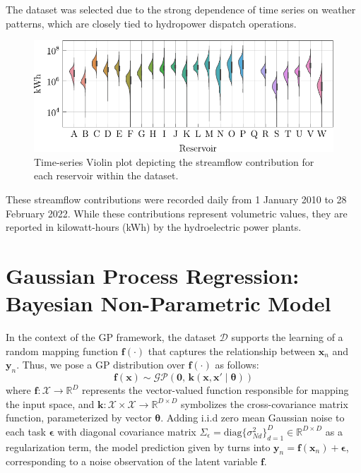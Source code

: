 \documentclass[10pt, xcolor=table]{beamer}
\begin{document}
\begin{frame}
	The dataset was selected due to the strong dependence of time series on weather patterns, which are closely tied to hydropower dispatch operations.
	
	\begin{figure}[htbp]
		\centering
		\includegraphics[height=0.25\textwidth]{images/ct_violinplot.pdf}
		\caption{Time-series Violin plot depicting the streamflow contribution for each reservoir within the dataset.}
	\end{figure}	
	
	These streamflow contributions were recorded daily from 1 January 2010 to 28 February 2022. While these contributions represent volumetric values, they are reported in kilowatt-hours (kWh) by the hydroelectric power plants.
\end{frame}



\section[Gaussian Process Regression]{Gaussian Process Regression: Bayesian Non-Parametric Model}
\begin{frame}
	In the context of the GP framework, the dataset $\mathcal{D}$ supports the learning of a random mapping function $\bm{f}(\cdot)$ that captures the relationship between $\bm{x}_n$ and $\bm{y}_n$. Thus, we pose a GP distribution over $\bm{f}(\cdot)$ as follows:
	\begin{equation}\label{mogp_notation}
	\bm{f}(\bm{x}) \sim  \mathcal{GP}\left(\bm{0},\, \bm{k}(\bm{x}, \bm{x}' \mid \bm{\theta})\right)
	\end{equation}
	where $\bm{f}: \mathcal{X} \rightarrow \mathbb{R}^D$ represents the vector-valued function responsible for mapping the input space, and {$\bm{k}: \mathcal{X} \times \mathcal{X} \rightarrow \mathbb{R}^{D \times D}$}
	symbolizes the cross-covariance matrix function, parameterized by vector $\bm{\theta}$. Adding i.i.d zero mean Gaussian noise to each task $\bm{\epsilon}$ with diagonal covariance matrix $\Sigma_\epsilon = \text{diag}\{\sigma^2_{Nd}\}_{d=1}^D \in \mathbb{R}^{D \times D}$ as a regularization term, the model prediction given by  turns into $\bm{y}_n = \bm{f}(\bm{x}_n) + \bm{\epsilon}$, corresponding to a noise observation of the latent variable $\bm{f}$. 
\end{frame}
\end{document}
